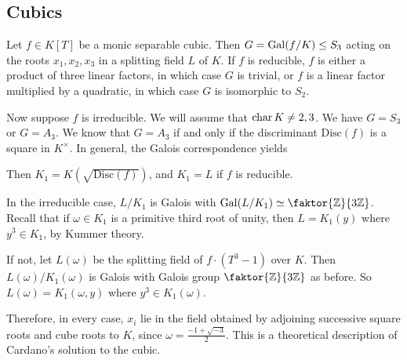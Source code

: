 \subsection{Cubics}
Let \( f \in K[T] \) be a monic separable cubic.
Then \( G = \operatorname{Gal}(f/K) \leq S_3 \) acting on the roots \( x_1, x_2, x_3 \) in a splitting field \( L \) of \( K \).
If \( f \) is reducible, \( f \) is either a product of three linear factors, in which case \( G \) is trivial, or \( f \) is a linear factor multiplied by a quadratic, in which case \( G \) is isomorphic to \( S_2 \).

Now suppose \( f \) is irreducible.
We will assume that \( \operatorname{char} K \neq 2, 3 \).
We have \( G = S_3 \) or \( G = A_3 \).
We know that \( G = A_3 \) if and only if the discriminant \( \mathrm{Disc}(f) \) is a square in \( K^\times \).
In general, the Galois correspondence yields
\begin{center}
\end{center}
Then \( K_1 = K(\sqrt{\mathrm{Disc}(f)}) \), and \( K_1 = L \) if \( f \) is reducible.

In the irreducible case, \( L / K_1 \) is Galois with \( \Gal(L/K_1) \simeq \faktor{\mathbb Z}{3\mathbb Z} \).
Recall that if \( \omega \in K_1 \) is a primitive third root of unity, then \( L = K_1(y) \) where \( y^3 \in K_1 \), by Kummer theory.

If not, let \( L(\omega) \) be the splitting field of \( f \cdot (T^3 - 1) \) over \( K \).
Then \( L(\omega) / K_1(\omega) \) is Galois with Galois group \( \faktor{\mathbb Z}{3\mathbb Z} \) as before.
So \( L(\omega) = K_1(\omega, y) \) where \( y^3 \in K_1(\omega) \).

Therefore, in every case, \( x_i \) lie in the field obtained by adjoining successive square roots and cube roots to \( K \), since \( \omega = \frac{-1 + \sqrt{-3}}{2} \).
This is a theoretical description of Cardano's solution to the cubic.
